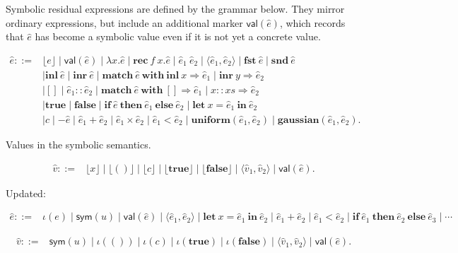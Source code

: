 Symbolic residual expressions are defined by the grammar below.  They
mirror ordinary expressions, but include an additional marker
$\mathsf{val}(\hat e)$, which records that $\hat e$ has become a
symbolic value even if it is not yet a concrete value.

\[
\begin{aligned}
\hat e ::= {}&
    \lfloor e \rfloor
  \mid \mathsf{val}(\hat e)
  \mid \lambda x.\hat e
  \mid \mathbf{rec}\ f\ x.\hat e
  \mid \hat e_1\ \hat e_2
  \mid \langle \hat e_1,\hat e_2\rangle
  \mid \mathbf{fst}\ \hat e
  \mid \mathbf{snd}\ \hat e
\\
& \mid \mathbf{inl}\ \hat e
  \mid \mathbf{inr}\ \hat e
  \mid \mathbf{match}\ \hat e\ \mathbf{with}\ 
        \mathbf{inl}\ x \Rightarrow \hat e_1
        \mid
        \mathbf{inr}\ y \Rightarrow \hat e_2
\\
& \mid []
  \mid \hat e_1 :: \hat e_2
  \mid \mathbf{match}\ \hat e\ \mathbf{with}\ 
        [] \Rightarrow \hat e_1
        \mid
        x :: xs \Rightarrow \hat e_2
\\
& \mid \mathbf{true}
  \mid \mathbf{false}
  \mid \mathbf{if}\ \hat e\ \mathbf{then}\ \hat e_1\ \mathbf{else}\ \hat e_2
  \mid \mathbf{let}\ x = \hat e_1\ \mathbf{in}\ \hat e_2
\\
& \mid c
  \mid -\hat e
  \mid \hat e_1 + \hat e_2
  \mid \hat e_1 \times \hat e_2
  \mid \hat e_1 < \hat e_2
  \mid \mathbf{uniform}(\hat e_1,\hat e_2)
  \mid \mathbf{gaussian}(\hat e_1,\hat e_2).
\end{aligned}
\]

Values in the symbolic semantics. 

\[
\begin{aligned}
\hat v ::= {}&
    \lfloor x \rfloor
  \mid \lfloor () \rfloor
  \mid \lfloor c \rfloor
  \mid \lfloor \mathbf{true} \rfloor
  \mid \lfloor \mathbf{false} \rfloor
  \mid \langle \hat v_1,\hat v_2\rangle
  \mid \mathsf{val}(\hat e).
\end{aligned}
\]

Updated:

\[
\begin{aligned}
\hat e ::= {}&
    \iota(e)
  \mid \mathsf{sym}(u)
  \mid \mathsf{val}(\hat e)
  \mid \langle \hat e_1,\hat e_2\rangle
  \mid \mathbf{let}\ x = \hat e_1\ \mathbf{in}\ \hat e_2
  \mid \hat e_1 + \hat e_2
  \mid \hat e_1 < \hat e_2
  \mid \mathbf{if}\ \hat e_1\ \mathbf{then}\ \hat e_2\ \mathbf{else}\ \hat e_3
  \mid \cdots
\end{aligned}
\]

\[
\begin{aligned}
\hat v ::= {}&
    \mathsf{sym}(u)
  \mid \iota(())
  \mid \iota(c)
  \mid \iota(\mathbf{true})
  \mid \iota(\mathbf{false})
  \mid \langle \hat v_1,\hat v_2\rangle
  \mid \mathsf{val}(\hat e).
\end{aligned}
\]
